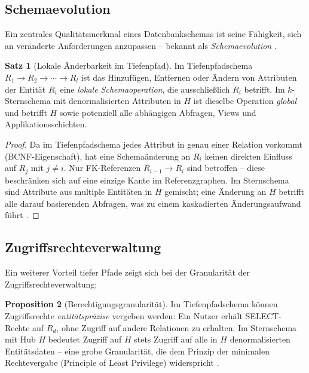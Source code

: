 ﻿\documentclass[a4paper,12pt]{report}
\theoremstyle{definition}
\newtheorem{theorem}{Satz}[chapter]
\newtheorem{proposition}[theorem]{Proposition}
\theoremstyle{remark}
\begin{document}
\subsection{Schemaevolution}

Ein zentrales Qualitätsmerkmal eines Datenbankschemas ist seine
Fähigkeit, sich an veränderte Anforderungen anzupassen -- bekannt als
\emph{Schemaevolution} \cite{Roddick1995}.

\begin{theorem}[Lokale Änderbarkeit im Tiefenpfad]
\label{thm:schaemaevolution}
Im Tiefenpfadschema $R_1 \to R_2 \to \cdots \to R_l$ ist das Hinzufügen,
Entfernen oder Ändern von Attributen der Entität $R_i$ eine
\emph{lokale Schemaoperation}, die ausschließlich $R_i$ betrifft.
Im $k$-Sternschema mit denormalisierten Attributen in $H$ ist dieselbe
Operation \emph{global} und betrifft $H$ sowie potenziell alle
abhängigen Abfragen, Views und Applikationsschichten.
\end{theorem}

\begin{proof}
Da im Tiefenpfadschema jedes Attribut in genau einer Relation vorkommt
(BCNF-Eigenschaft), hat eine Schemaänderung an $R_i$ keinen direkten
Einfluss auf $R_j$ mit $j \neq i$. Nur FK-Referenzen
$R_{i-1} \to R_i$ sind betroffen -- diese beschränken sich auf eine
einzige Kante im Referenzgraphen. Im Sternschema sind Attribute aus
multiple Entitäten in $H$ gemischt; eine Änderung an $H$ betrifft
alle darauf basierenden Abfragen, was zu einem kaskadierten
Änderungsaufwand führt \cite{Ambler2003}.
\end{proof}

\subsection{Zugriffsrechteverwaltung}

Ein weiterer Vorteil tiefer Pfade zeigt sich bei der Granularität der
Zugriffsrechteverwaltung:

\begin{proposition}[Berechtigungsgranularität]
Im Tiefenpfadschema können Zugriffsrechte \emph{entitätspräzise} vergeben
werden: Ein Nutzer erhält SELECT-Rechte auf $R_d$, ohne Zugriff auf andere
Relationen zu erhalten. Im Sternschema mit Hub $H$ bedeutet Zugriff auf
$H$ stets Zugriff auf alle in $H$ denormalisierten Entitätsdaten --
eine grobe Granularität, die dem Prinzip der minimalen Rechtevergabe
(Principle of Least Privilege) widerspricht \cite{Saltzer1975}.
\end{proposition}
\end{document}
